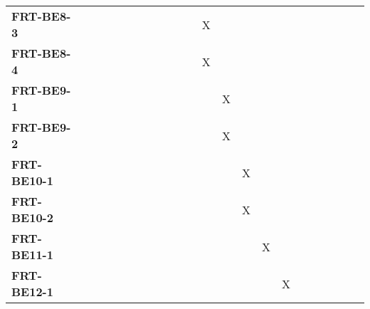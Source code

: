 \documentclass[12pt, titlepage]{article}
\begin{document}
\begin{landscape}
\begin{longtable}{|l|cccccccccccccccc|}
		\textbf{FRT-BE8-3}  & ~                                                         & ~            & ~            & ~            & ~            & ~            & ~            & X            & ~            & ~             & ~             & ~             & ~             & ~             & ~             & ~             \\
		\textbf{FRT-BE8-4}  & ~                                                         & ~            & ~            & ~            & ~            & ~            & ~            & X            & ~            & ~             & ~             & ~             & ~             & ~             & ~             & ~             \\
		\textbf{FRT-BE9-1}  & ~                                                         & ~            & ~            & ~            & ~            & ~            & ~            & ~            & X            & ~             & ~             & ~             & ~             & ~             & ~             & ~             \\
		\textbf{FRT-BE9-2}  & ~                                                         & ~            & ~            & ~            & ~            & ~            & ~            & ~            & X            & ~             & ~             & ~             & ~             & ~             & ~             & ~             \\
		\textbf{FRT-BE10-1} & ~                                                         & ~            & ~            & ~            & ~            & ~            & ~            & ~            & ~            & X             & ~             & ~             & ~             & ~             & ~             & ~             \\
		\textbf{FRT-BE10-2} & ~                                                         & ~            & ~            & ~            & ~            & ~            & ~            & ~            & ~            & X             & ~             & ~             & ~             & ~             & ~             & ~             \\
		\textbf{FRT-BE11-1} & ~                                                         & ~            & ~            & ~            & ~            & ~            & ~            & ~            & ~            & ~             & X             & ~             & ~             & ~             & ~             & ~             \\
		\textbf{FRT-BE12-1} & ~                                                         & ~            & ~            & ~            & ~            & ~            & ~            & ~            & ~            & ~             & ~             & X             & ~             & ~             & ~             & ~             \\

\end{longtable}
\end{landscape}
\end{document}
